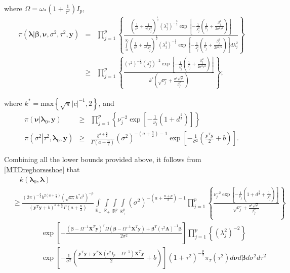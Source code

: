 \documentclass[noinfoline,11pt]{imsart}
\numberwithin{equation}{section}
\theoremstyle{plain}
\newcommand{\y}{\mathbf{y}}
\newcommand{\X}{\mathbf{X}}
\newcommand{\bb}{\boldsymbol{\beta}}
\newcommand{\bl}{\boldsymbol{\lambda}}
\newcommand{\Bl}{\boldsymbol{\Lambda}}
\begin{document}
\noindent
where $\Omega=\omega_*\left(1+\frac{1}{\tau^2}\right)I_p$, 
\begin{eqnarray*}
  \pi\left(\left.\bl\right|\boldsymbol{\beta,\nu},\sigma^2,\tau^2,\y\right)&=& \prod_{j=1}^p\left\{\frac{\left(\frac{1}{c^2}+\frac{1}{\tau^2\lambda_j^2}\right)^{\frac{1}{2}}\left(\lambda_j^2\right)^{-\frac{3}{2}}\exp{\left[-\frac{1}{\lambda_j^2}\left(\frac{1}{\nu_j}+\frac{\beta_j^2}{2\sigma^2\tau^2}\right)\right]}}{\int\limits_0^\infty\left(\frac{1}{c^2}+\frac{1}{\tau^2\lambda_j^2}\right)^{\frac{1}{2}}\left(\lambda_j^2\right)^{-\frac{3}{2}}\exp{\left[-\frac{1}{\lambda_j^2}\left(\frac{1}{\nu_j}+\frac{\beta_j^2}{2\sigma^2\tau^2}\right)\right]}d\lambda_j^2}\right\}\\
  &\geq& \prod\limits_{j=1}^p\left\{\frac{\left(\tau^2\right)^{-\frac{1}{2}}\left(\lambda_j^2\right)^{-2}\exp{\left[-\frac{1}{\lambda_j^2}\left(\frac{1}{\nu_j}+\frac{\beta_j^2}{2\sigma^2\tau^2}\right)\right]}}{k^*\left(\sqrt{\nu_j}+\frac{\sigma^2\sqrt{\tau^2}}{\beta_j^2}\right)}\right\};
\end{eqnarray*}

\noindent
where $k^*=\text{max}\left\{\sqrt{\pi}|c|^{-1},2\right\}$, and 
\begin{eqnarray} \label{lowerboundsreghorseshoe}
   \pi\left(\left.\boldsymbol{\nu}\right|\bl_0,\y\right)&\geq& \prod\limits_{j=1}^p\left\{\nu_j^{-2}\exp{\left[-\frac{1}{\nu_j}\left(1+d^{\frac{2}{\delta}}\right)\right]}\right\}\nonumber \\
\pi\left(\left.\sigma^2\right|\tau^2,\bl_0,\y\right)&\geq& \frac{b^{a+\frac{n}{2}}}{\Gamma\left(a+\frac{n}{2}\right)}\left(\sigma^2\right)^{-\left(a+\frac{n}{2}\right)-1}\exp{\left[-\frac{1}{\sigma^2}\left(\frac{\y^T\y}{2}+b\right)\right]}. 
\end{eqnarray}

\noindent
Combining all the lower bounds provided above, it follows from \eqref{MTDreghorseshoe} that
\begin{align*}\label{minorizationproofreghorseshoe}
& \quad k\left(\bl_0,\bl\right)\nonumber \\
& \geq \frac{\left(2\pi\right)^{-\frac{p}{2}}b^{2\left(a+\frac{n}{2}\right)}\left(\sqrt{\omega_*}k^*c^2\right)^{-p}}{\left(\y^T\y+b\right)^{a+\frac{n}{2}}\Gamma\left(a+\frac{n}{2}\right)}\int\limits_{\mathbb{R}_+}\int\limits_{\mathbb{R}_+}\int\limits_{\mathbb{R}^p}\int\limits_{\mathbb{R}^p_+}\left(\sigma^2\right)^{-\left(a+\frac{n+p}{2}\right)-1}\prod\limits_{j=1}^p\left\{\frac{\nu_j^{-2}\exp{\left[-\frac{1}{\nu_j}\left(1+d^{\frac{2}{\delta}}+\frac{1}{\lambda_j^2}\right)\right]}}{\sqrt{\nu_j}+\frac{\sigma^2\sqrt{\tau^2}}{\beta_j^2}}\right\}\nonumber \\ 
& \qquad \qquad \exp{\left[-\frac{\left(\bb-\Omega^{-1}\X^T\y\right)^T\Omega\left(\bb-\Omega^{-1}\X^T\y\right)+\bb^T\left(\tau^2\Bl\right)^{-1}\bb}{2\sigma^2}\right]}\prod\limits_{j=1}^p\left\{\left(\lambda_j^2\right)^{-2}\right\}\nonumber \\
& \qquad \qquad \exp{\left[-\frac{1}{\sigma^2}\left(\frac{\y^T\y+\y^T\X\left(c^2I_p-\Omega^{-1}\right)\X^T\y}{2}+b\right)\right]}\left(1+\tau^2\right)^{-\frac{p}{2}}\pi_\tau\left(\tau^2\right)d\boldsymbol{\nu}d\bb d\sigma^2 d\tau^2\nonumber \\
\end{align*}
\end{document}
